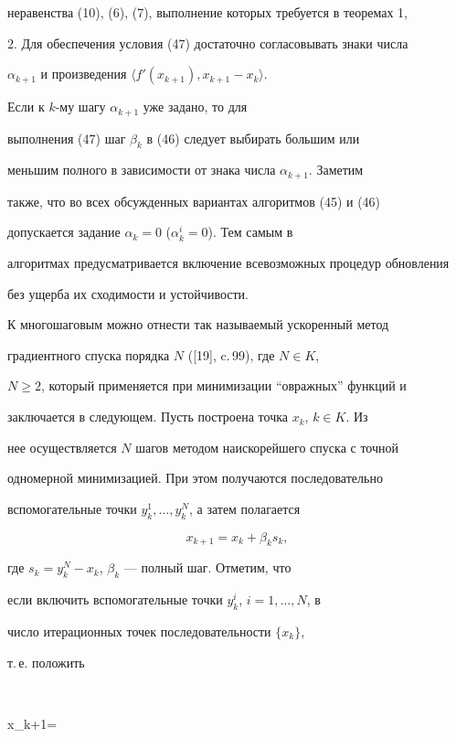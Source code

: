 неравенства (10), (6), (7), выполнение которых требуется в теоремах 1,


2. Для обеспечения условия (47) достаточно согласовывать знаки числа


$\alpha_{k+1}$ и произведения $\langle{{f}'(x_{k+1}),x_{k+1}-x_k}\rangle$.


Если к $k$-му шагу $\alpha_{k+1}$ уже задано, то для


выполнения (47) шаг $\beta_k$ в (46) следует выбирать большим или


меньшим полного в зависимости от знака числа $\alpha_{k+1}$. Заметим


также, что во всех обсужденных вариантах алгоритмов (45) и (46)


допускается задание $\alpha_k=0$ ($\alpha_k^i=0$). Тем самым в


алгоритмах предусматривается включение всевозможных процедур обновления


без ущерба их сходимости и устойчивости.





К многошаговым можно отнести так называемый ускоренный метод


градиентного спуска порядка $N$ ([19], c.\,99), где $N\in K$,


$N\ge 2$, который применяется при минимизации ``овражных'' функций и


заключается в следующем. Пусть построена точка $x_k$, $k\in K$. Из


нее осуществляется $N$ шагов методом наискорейшего спуска с точной


одномерной минимизацией. При этом получаются последовательно


вспомогательные точки $y_k^1,\dotsc,y_k^{N}$, а затем полагается


\begin{equation}


x_{k+1}=x_k+\beta_ks_k,


\end{equation}


где $s_k=y_k^{N}-x_k$, $\beta_k $ --- полный шаг. Отметим, что


если включить вспомогательные точки $y_k^i$, $i=1,\dotsc,N$, в


число итерационных точек последовательности $\{{x_k}\}$,


т.\,е. положить


$$


x_{k+1}=


